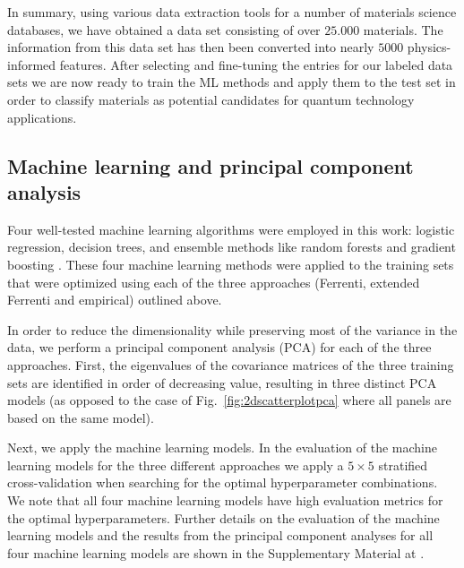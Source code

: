 \documentclass[superscriptaddress,unsortedaddress,
 amsmath,amssymb,
 aps,
]{revtex4-2}
\begin{document}
In summary, using various data extraction tools for a number of materials science databases, we have obtained a data set consisting of over $25.000$ materials. The information from this data set has then been converted into nearly $5000$ physics-informed features.  
After selecting and fine-tuning the entries for our labeled data sets we are now ready to train the ML methods and apply them to the test set in order to classify materials as potential candidates for quantum technology applications. 

\subsection*{Machine learning and principal component analysis}

Four well-tested machine learning algorithms were employed in this work: logistic regression, decision trees, and ensemble methods like random forests and gradient boosting \cite{Mehta2019,Hastie2009}. 
These four machine learning methods were applied to the training sets that were optimized using each of the three approaches (Ferrenti, extended Ferrenti and empirical) outlined above. %

In order to reduce the dimensionality while preserving most of the variance in the data,
we perform a principal component analysis (PCA) for each of the three approaches.
First, the eigenvalues of the covariance matrices of the three training sets are identified in order of decreasing value,  resulting in three distinct PCA models (as opposed to the case of Fig.~\ref{fig:2dscatterplotpca} where all panels are based on the same model). 

Next, we apply the machine learning models. In the evaluation of the machine learning models for the three different approaches we apply a $5\times 5$ stratified cross-validation when searching for the optimal hyperparameter combinations. We note that all four machine learning models have high evaluation metrics for the optimal hyperparameters. Further details on the evaluation of the machine learning models and the results from the principal component analyses for all four machine learning models are shown in the Supplementary Material at \cite{supplementary}. 
\end{document}
